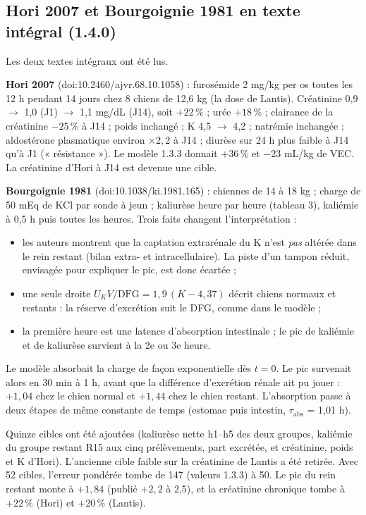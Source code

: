 \documentclass[10pt,a4paper]{article}
\begin{document}
\subsection{Hori 2007 et Bourgoignie 1981 en texte intégral (1.4.0)}
Les deux textes intégraux ont été lus.

\textbf{Hori 2007} (doi:10.2460/ajvr.68.10.1058) : furosémide 2 mg/kg per os toutes les 12 h pendant 14 jours chez 8 chiens de 12,6 kg (la dose de Lantis). Créatinine 0,9 $\to$ 1,0 (J1) $\to$ 1,1 mg/dL (J14), soit $+22$\,\% ; urée $+18$\,\% ; clairance de la créatinine $-25$\,\% à J14 ; poids inchangé ; K 4,5 $\to$ 4,2 ; natrémie inchangée ; aldostérone plasmatique environ $\times 2{,}2$ à J14 ; diurèse sur 24 h plus faible à J14 qu'à J1 (« résistance »). Le modèle 1.3.3 donnait $+36$\,\% et $-23$ mL/kg de VEC. La créatinine d'Hori à J14 est devenue une cible.

\textbf{Bourgoignie 1981} (doi:10.1038/ki.1981.165) : chiennes de 14 à 18 kg ; charge de 50 mEq de KCl par sonde à jeun ; kaliurèse heure par heure (tableau 3), kaliémie à 0,5 h puis toutes les heures. Trois faits changent l'interprétation :
\begin{itemize}
\item les auteurs montrent que la captation extrarénale du K n'est \emph{pas} altérée dans le rein restant (bilan extra- et intracellulaire). La piste d'un tampon réduit, envisagée pour expliquer le pic, est donc écartée ;
\item une seule droite $U_KV/\mathrm{DFG} = 1{,}9\,(K - 4{,}37)$ décrit chiens normaux et restants : la réserve d'excrétion suit le DFG, comme dans le modèle ;
\item la première heure est une latence d'absorption intestinale ; le pic de kaliémie et de kaliurèse survient à la 2e ou 3e heure.
\end{itemize}
Le modèle absorbait la charge de façon exponentielle dès $t = 0$. Le pic survenait alors en 30 min à 1 h, avant que la différence d'excrétion rénale ait pu jouer : $+1{,}04$ chez le chien normal et $+1{,}44$ chez le chien restant. L'absorption passe à deux étapes de même constante de temps (estomac puis intestin, $\tau_\mathrm{abs}$ = 1,01 h).

Quinze cibles ont été ajoutées (kaliurèse nette h1–h5 des deux groupes, kaliémie du groupe restant R15 aux cinq prélèvements, part excrétée, et créatinine, poids et K d'Hori). L'ancienne cible faible sur la créatinine de Lantis a été retirée. Avec 52 cibles, l'erreur pondérée tombe de 147 (valeurs 1.3.3) à 50. Le pic du rein restant monte à $+1{,}84$ (publié $+2{,}2$ à 2,5), et la créatinine chronique tombe à $+22$\,\% (Hori) et $+20$\,\% (Lantis).
\end{document}
